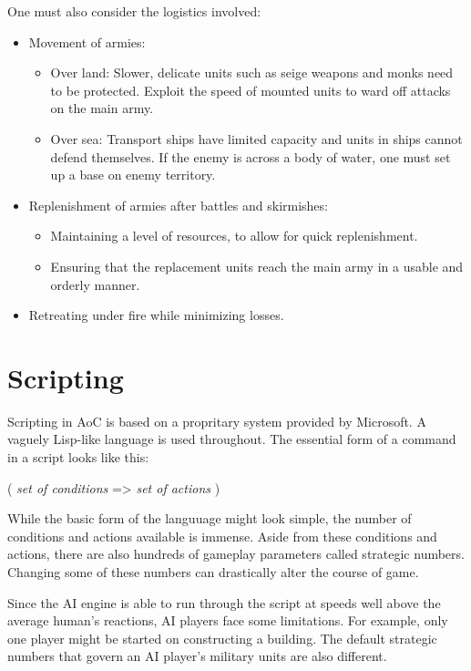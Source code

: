 \documentclass[a4paper,12pt]{article}
\begin{document}
One must also consider the logistics involved: 
\begin{itemize}
	\item Movement of armies:
	\begin{itemize}
		\item Over land:	Slower, delicate units such as seige weapons and monks need to be protected.
				Exploit the speed of mounted units to ward off attacks on the main army.
		\item Over sea:	Transport ships have limited capacity and units in ships cannot defend themselves.
				If the enemy is across a body of water, one must set up a base on enemy territory. 
	\end{itemize}
	\item Replenishment of armies after battles and skirmishes:
	\begin{itemize}
		\item Maintaining a level of resources, to allow for quick replenishment.
		\item Ensuring that the replacement units reach the main army in a usable and orderly manner.
	\end{itemize}
	\item Retreating under fire while minimizing losses.
\end{itemize}

\section*{Scripting}
Scripting in AoC is based on a propritary system provided by Microsoft. A vaguely 
Lisp-like language is used throughout. The essential form of a command in a script 
looks like this:
\begin{program}
( 
	\emph{set of conditions} =>	\emph{set of actions}
)
\end{program}
While the basic form of the languuage might look simple, the number of conditions and 
actions available is immense. Aside from these conditions and actions, there are also 
hundreds of gameplay parameters called strategic numbers. Changing some of these numbers 
can drastically alter the course of game.

Since the AI engine is able to run through the script at speeds well above the average 
human's reactions, AI players face some limitations. For example, only one player might 
be started on constructing a building. The default strategic numbers that govern an AI 
player's military units are also different.
\end{document}
